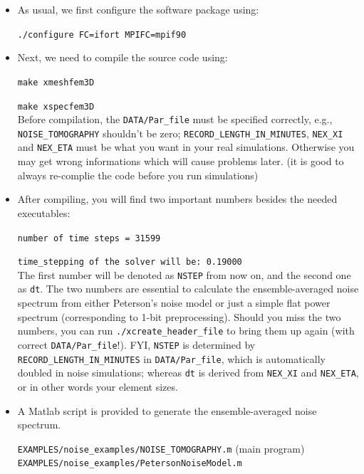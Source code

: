 \documentclass[oneside,english]{book}
\begin{document}
\begin{itemize}

\item
As usual, we first configure the software package using:

\texttt{./configure FC=ifort MPIFC=mpif90} \\

\item
Next, we need to compile the source code using:

\texttt{make xmeshfem3D}

\texttt{make xspecfem3D} \\

Before compilation, the \texttt{DATA/Par\_file} must be specified correctly, e.g.,
\texttt{NOISE\_TOMOGRAPHY} shouldn't be zero; \texttt{RECORD\_LENGTH\_IN\_MINUTES},
\texttt{NEX\_XI} and \texttt{NEX\_ETA} must be what you want in your real simulations.
Otherwise you may get wrong informations which will cause problems later. 
(it is good to always re-complie the code before you run simulations)\\

\item
After compiling, you will find two important numbers besides the needed executables:

\texttt{number of time steps = 31599}

\texttt{time\_stepping of the solver will be: 0.19000}\\

The first number will be denoted as \texttt{NSTEP} from now on, and the second one as \texttt{dt}.
The two numbers are essential to calculate the ensemble-averaged noise spectrum from either Peterson's noise
model or just a simple flat power spectrum (corresponding to 1-bit preprocessing). 
Should you miss the two numbers, you can run
\texttt{./xcreate\_header\_file} to bring them up again (with correct \texttt{DATA/Par\_file}!).
FYI, \texttt{NSTEP} is determined by \texttt{RECORD\_LENGTH\_IN\_MINUTES} in \texttt{DATA/Par\_file},
which is automatically doubled in noise simulations; whereas \texttt{dt} is derived from
\texttt{NEX\_XI} and \texttt{NEX\_ETA}, or in other words your element sizes.


\item
A Matlab script is provided to generate the ensemble-averaged noise spectrum.

\texttt{EXAMPLES/noise\_examples/NOISE\_TOMOGRAPHY.m}  (main program)\\
\texttt{EXAMPLES/noise\_examples/PetersonNoiseModel.m}



\end{itemize}
\end{document}
